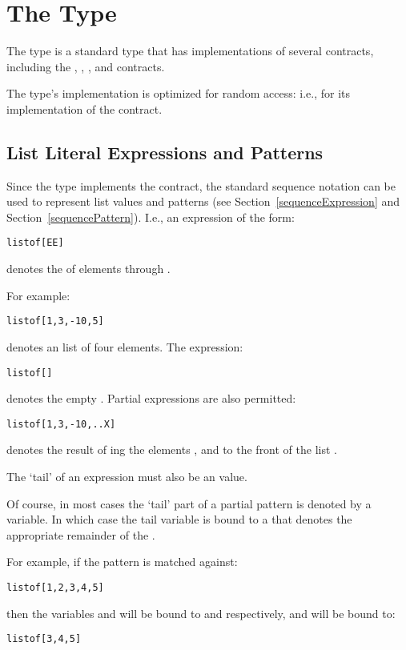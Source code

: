 \section{The  Type}
\label{arrayType}
The  type is a standard type that has implementations of several contracts, including the , , ,  and  contracts.

The  type's implementation is optimized for random access: i.e., for its implementation of the  contract.

\subsection{List Literal Expressions and Patterns}
\label{listLiteral}
Since the  type implements the  contract, the standard sequence notation can be used to represent list values and patterns (see Section~\vref{sequenceExpression} and Section~\vref{sequencePattern}). I.e., an expression of the form:
\begin{alltt}
list of [E\sequence{,}E\subn]
\end{alltt}
denotes the  of elements  through .

For example:
\begin{alltt}
list of [1, 3, -10, 5]
\end{alltt}
denotes an list of four  elements. The expression:
\begin{alltt}
list of []
\end{alltt}
denotes the empty . Partial  expressions are also permitted:
\begin{alltt}
list of [1, 3, -10 ,.. X]
\end{alltt}
denotes the result of ing the elements ,  and  to the front of the list .
\begin{aside}
The `tail' of an  expression must also be an  value.
\end{aside}

\begin{aside}
Of course, in most cases the `tail' part of a partial  pattern is denoted by a variable. In which case the tail variable is bound to a  that denotes the appropriate remainder of the .

For example, if the pattern  is matched against:
\begin{alltt}
list of [1, 2, 3, 4, 5]
\end{alltt}
then the variables  and  will be bound to  and  respectively, and  will be bound to:
\begin{alltt}
list of [3, 4, 5]
\end{alltt}
\end{aside}

